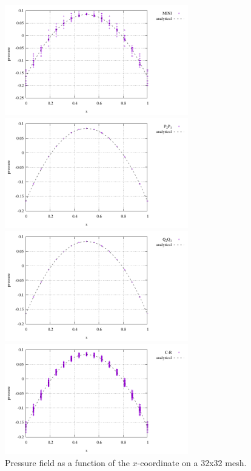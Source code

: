 \begin{center}
\includegraphics[width=8cm]{python_codes/fieldstone_112/results/pressMINI}
\includegraphics[width=8cm]{python_codes/fieldstone_112/results/pressP2P1}\\
\includegraphics[width=8cm]{python_codes/fieldstone_112/results/pressQ2Q1}
\includegraphics[width=8cm]{python_codes/fieldstone_112/results/pressCR}\\
{\captionfont Pressure field as a function of the $x$-coordinate on a 32x32 mesh.} 
\end{center}


